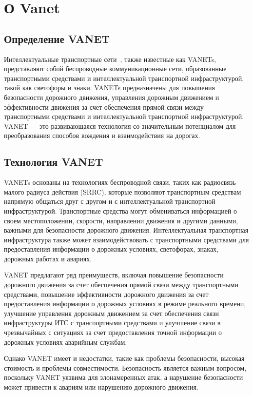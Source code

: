 \chapter{О Vanet }

\section{Определение VANET}


Интеллектуальные транспортные сети~\cite{AutonomousVehicles,VehicularNetworking}, также известные как VANETs,
представляют собой беспроводные коммуникационные сети, образованные
транспортными средствами и интеллектуальной транспортной
инфраструктурой, такой как светофоры и знаки.  VANETs предназначены
для повышения безопасности дорожного движения, управления дорожным
движением и эффективности движения за счет обеспечения прямой связи
между транспортными средствами и интеллектуальной транспортной
инфраструктурой. VANET — это развивающаяся технология со значительным
потенциалом для преобразования способов вождения и взаимодействия на
дорогах.

\section{Технология VANET}

VANETs основаны на технологиях беспроводной связи, таких как
радиосвязь малого радиуса действия (SRRC), которые позволяют
транспортным средствам напрямую общаться друг с другом и с
интеллектуальной транспортной инфраструктурой. Транспортные средства
могут обмениваться информацией о своем местоположении, скорости,
направлении движения и другими данными, важными для безопасности
дорожного движения. Интеллектуальная транспортная инфраструктура также
может взаимодействовать с транспортными средствами для предоставления
информации о дорожных условиях, светофорах, знаках, дорожных работах и
авариях.

VANET предлагают ряд преимуществ, включая повышение безопасности
дорожного движения за счет обеспечения прямой связи между
транспортными средствами, повышение эффективности дорожного движения
за счет предоставления информации о дорожных условиях в режиме
реального времени, улучшение управления дорожным движением за счет
обеспечения связи инфраструктуры ИТС с транспортными средствами и
улучшение связи в чрезвычайных с ситуациях за счет предоставления
точной информации о дорожных условиях аварийным службам.

Однако VANET имеет и недостатки, такие как проблемы безопасности,
высокая стоимость и проблемы совместимости.  Безопасность является
важным вопросом, поскольку VANET уязвима для злонамеренных атак, а
нарушение безопасности может привести к авариям или нарушению
дорожного движения.

